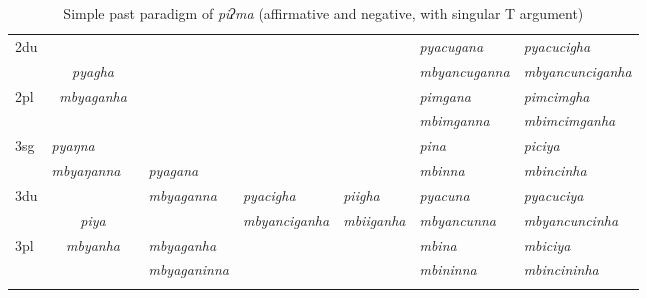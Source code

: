 \begin{sidewaystable}[p]
{\begin{tabular}{|l||p{2.4cm}|p{1.5cm}|p{2.4cm}|p{2.4cm}|p{2.4cm}|p{3.2cm}|p{3.2cm}|}
 \cline{1-2} \cline{7-8}			
{\sc 2du}		& 	\multicolumn{2}{c|}{}     &  \multicolumn{3}{c|}{\cellcolor[gray]{.8}} & \it  pyacugana  & \it   pyacucigha \\
		&  	\multicolumn{2}{c|}{\it  pyagha} &   \multicolumn{3}{c|}{\cellcolor[gray]{.8}}& \it mbyancuganna  & \it  mbyancunciganha \\
 \cline{1-1} \cline{7-8}			
{\sc 2pl}	& 	\multicolumn{2}{c|}{\it mbyaganha} &   \multicolumn{3}{c|}{ \cellcolor[gray]{.8}}& \it  pimgana& \it  pimcimgha  \\
		&  	\multicolumn{2}{c|}{ }&   \multicolumn{3}{c|}{\cellcolor[gray]{.8} }& \it  mbimganna & \it  mbimcimganha \\
\midrule			
{\sc 3sg}	& \it pyaŋna	  & \it 	      	& \it   			& \it     & \it     	& \it pina& \it piciya\\
		& \it  mbyaŋanna   & \it    	& \it  pyagana& \it   & \it    & \it mbinna& \it mbincinha\\
  \cline{1-2}  \cline{7-8}					
{\sc 3du}		&   \multicolumn{2}{c|}{}& \it mbyaganna& \it pyacigha & \it    piigha& \it   pyacuna & \it   pyacuciya\\
		&   \multicolumn{2}{c|}{\it piya}& \it   		& \it 		mbyanciganha	& \it  mbiiganha & \it  mbyancunna & \it  mbyancuncinha\\
 \cline{1-1} \cline{4-4} \cline{7-8}	
{\sc 3pl}		&\multicolumn{2}{c|}{\it mbyanha}& \it mbyaganha& \it & \it  & \it mbina& \it mbiciya\\	
	& \multicolumn{2}{c|}{ }& \it mbyaganinna& \it  & \it  & \it mbininna& \it mbincininha \\
\lspbottomrule
\end{tabular}
}
\caption{Simple past paradigm of \emph{piʔma}  (affirmative and negative, with singular T argument)}\label{par-pipma-pst}
\end{sidewaystable}



